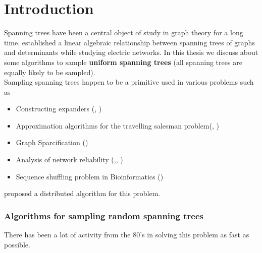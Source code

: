 
\chapter{Introduction} %

\label{Chapter1} %


\newcommand{\keyword}[1]{\textbf{#1}}
\newcommand{\tabhead}[1]{\textbf{#1}}
\newcommand{\code}[1]{\texttt{#1}}
\newcommand{\file}[1]{\texttt{\bfseries#1}}
\newcommand{\option}[1]{\texttt{\itshape#1}}


Spanning trees have been a central object of study in graph theory for a long time. \cite{doi:10.1002/andp.18471481202} established a linear algebraic relationship between spanning trees of graphs and determinants while studying electric networks. In this thesis we discuss about some algorithms to sample \textbf{uniform spanning trees} (all spanning trees are equally likely to be sampled). \\


Sampling spanning trees happen to be a primitive used in various problems such as - 

\begin{itemize}
\item Constructing expanders (\cite{10.5555/1496770.1496834}, \cite{doi:10.1137/120890971})
\item Approximation algorithms for the travelling salesman problem(\cite{6108216}, \cite{doi:10.1287/opre.2017.1603})
\item Graph Sparcification (\cite{DBLP:journals/corr/abs-1005-0265})
\item Analysis of network reliability (\cite{10.5555/535891},\cite{doi:10.1002/net.3230200303}, \cite{colbourn1988estimating})
\item Sequence shuffling problem in Bioinformatics (\cite{KANDEL1996171})

\end{itemize}

\cite{10.1007/3-540-51687-5_27} proposed a distributed algorithm for this problem.


\subsection{Algorithms for sampling random spanning trees}
There has been a lot of activity from the 80's in solving this problem as fast as possible. 

